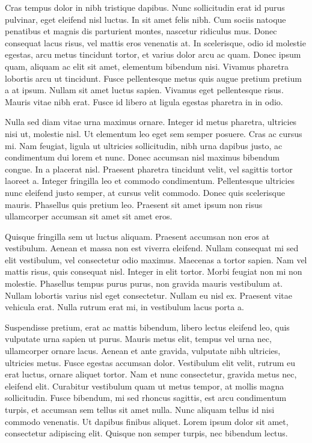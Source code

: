 \documentclass[a4paper,11pt]{kth-mag}
\begin{document}
Cras tempus dolor in nibh tristique dapibus. Nunc sollicitudin erat id purus pulvinar, eget eleifend nisl luctus. In sit amet felis nibh. Cum sociis natoque penatibus et magnis dis parturient montes, nascetur ridiculus mus. Donec consequat lacus risus, vel mattis eros venenatis at. In scelerisque, odio id molestie egestas, arcu metus tincidunt tortor, et varius dolor arcu ac quam. Donec ipsum quam, aliquam ac elit sit amet, elementum bibendum nisi. Vivamus pharetra lobortis arcu ut tincidunt. Fusce pellentesque metus quis augue pretium pretium a at ipsum. Nullam sit amet luctus sapien. Vivamus eget pellentesque risus. Mauris vitae nibh erat. Fusce id libero at ligula egestas pharetra in in odio.

Nulla sed diam vitae urna maximus ornare. Integer id metus pharetra, ultricies nisi ut, molestie nisl. Ut elementum leo eget sem semper posuere. Cras ac cursus mi. Nam feugiat, ligula ut ultricies sollicitudin, nibh urna dapibus justo, ac condimentum dui lorem et nunc. Donec accumsan nisl maximus bibendum congue. In a placerat nisl. Praesent pharetra tincidunt velit, vel sagittis tortor laoreet a. Integer fringilla leo et commodo condimentum. Pellentesque ultricies nunc eleifend justo semper, at cursus velit commodo. Donec quis scelerisque mauris. Phasellus quis pretium leo. Praesent sit amet ipsum non risus ullamcorper accumsan sit amet sit amet eros.

Quisque fringilla sem ut luctus aliquam. Praesent accumsan non eros at vestibulum. Aenean et massa non est viverra eleifend. Nullam consequat mi sed elit vestibulum, vel consectetur odio maximus. Maecenas a tortor sapien. Nam vel mattis risus, quis consequat nisl. Integer in elit tortor. Morbi feugiat non mi non molestie. Phasellus tempus purus purus, non gravida mauris vestibulum at. Nullam lobortis varius nisl eget consectetur. Nullam eu nisl ex. Praesent vitae vehicula erat. Nulla rutrum erat mi, in vestibulum lacus porta a.

Suspendisse pretium, erat ac mattis bibendum, libero lectus eleifend leo, quis vulputate urna sapien ut purus. Mauris metus elit, tempus vel urna nec, ullamcorper ornare lacus. Aenean et ante gravida, vulputate nibh ultricies, ultricies metus. Fusce egestas accumsan dolor. Vestibulum elit velit, rutrum eu erat luctus, ornare aliquet tortor. Nam et nunc consectetur, gravida metus nec, eleifend elit. Curabitur vestibulum quam ut metus tempor, at mollis magna sollicitudin. Fusce bibendum, mi sed rhoncus sagittis, est arcu condimentum turpis, et accumsan sem tellus sit amet nulla. Nunc aliquam tellus id nisi commodo venenatis. Ut dapibus finibus aliquet. Lorem ipsum dolor sit amet, consectetur adipiscing elit. Quisque non semper turpis, nec bibendum lectus.
\end{document}
